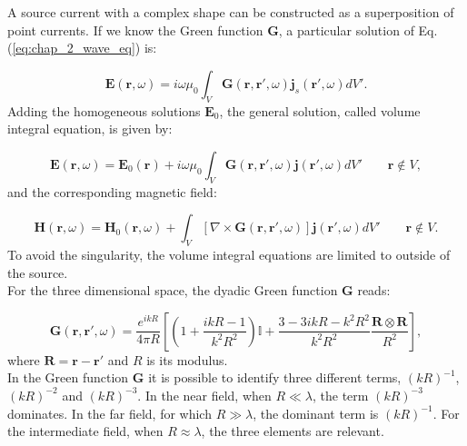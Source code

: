 A source current with a complex shape can be constructed as a superposition of point currents. If we know the Green function $\mathbf{G}$, a particular solution of Eq. (\ref{eq:chap_2_wave_eq}) is:

\begin{equation}
\mathbf{E}\left(\mathbf{r},\omega\right) = i\omega \mu_{0}\int_V^{}\mathbf{G}\left(\mathbf{r},\mathbf{r}',\omega\right)\mathbf{j}_{s}\left(\mathbf{r}',\omega\right) dV'.
\end{equation}
Adding the homogeneous solutions $\mathbf{E}_{0}$, the general solution, called volume integral equation, is given by:

\begin{equation}
\mathbf{E}\left(\mathbf{r},\omega\right) = \mathbf{E}_{0}\left(\mathbf{r}\right) +  i\omega \mu_{0}\int_V^{}\mathbf{G}\left(\mathbf{r},\mathbf{r}',\omega\right)\mathbf{j}\left(\mathbf{r}',\omega\right) dV' \qquad \mathbf{r} \notin V,
\end{equation}
and the corresponding magnetic field:

\begin{equation}
\mathbf{H}\left(\mathbf{r},\omega\right) = \mathbf{H}_{0}\left(\mathbf{r},\omega\right) +  \int_V^{}\left[\nabla \times \mathbf{G}\left(\mathbf{r},\mathbf{r}',\omega\right)\right]\mathbf{j}\left(\mathbf{r}',\omega\right) dV' \qquad \mathbf{r} \notin V.
\end{equation}
To avoid the singularity, the volume integral equations are limited to outside of the source.\\
For the three dimensional space, the dyadic Green function $\mathbf{G}$ reads:

\begin{equation}
\mathbf{G}\left(\mathbf{r},\mathbf{r}',\omega\right) = \frac{e^{ikR}}{4\pi R}\left[\left(1+\frac{ikR-1}{k^2R^2}\right)\mathbb{I}+\frac{3-3ikR-k^2R^2}{k^2R^2}\frac{\mathbf{R} \otimes\mathbf{R}}{R^2}\right],\label{Green_tensor}
\end{equation}
where $\mathbf{R} = \mathbf{r} - \mathbf{r}'$ and $R$ is its modulus.\\
In the Green function $\mathbf{G}$ it is possible to identify three different terms, $\left(kR\right)^{-1}$, $\left(kR\right)^{-2}$ and $\left(kR\right)^{-3}$. In the near field, when $R\ll\lambda$, the term $\left(kR\right)^{-3}$ dominates. In the far field, for which $R\gg\lambda$, the dominant term is $\left(kR\right)^{-1}$. For the intermediate field, when $R\approx\lambda$, the three elements are relevant.

